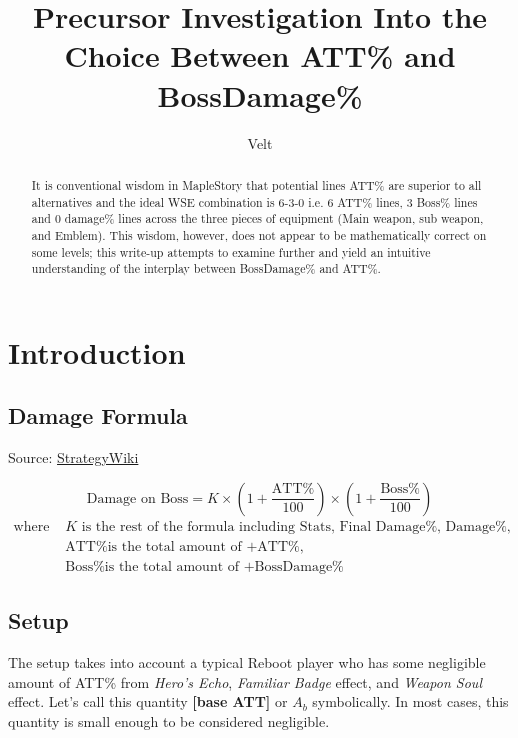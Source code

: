 \documentclass{article}
\title{Precursor Investigation Into the Choice Between ATT\% and BossDamage\%}
\author{Velt}
\begin{document}
\maketitle


\begin{abstract}
It is conventional wisdom in MapleStory that potential lines ATT\% are superior to all alternatives and the ideal WSE combination is 6-3-0 i.e. 6 ATT\% lines, 3 Boss\% lines and 0 damage\% lines across the three pieces of equipment (Main weapon, sub weapon, and Emblem).  
This wisdom, however, does not appear to be mathematically correct on some levels; this write-up attempts to examine further and yield an intuitive understanding of the interplay between BossDamage\% and ATT\%.
\end{abstract}

\vspace{1.5cm}

\section{Introduction}

\subsection{Damage Formula}

Source: \href{https://strategywiki.org/wiki/MapleStory/Formulas#Active_Skills}{StrategyWiki}

\begin{equation} \label{eq:1}
\text{Damage on Boss} = K \times \left( 1+\frac{\text{ATT\%}}{100} \right) \times \left( 1 + \frac{\text{Boss\%}}{100} \right)
\end{equation}
\begin{align*}
    \text{where } & K \text{ is the rest of the formula including Stats, Final Damage\%, Damage\%, etc.} \\
                  &  \text{ATT\% is the total amount of +ATT\%,} \\
                  &  \text{Boss\% is the total amount of +BossDamage\%}
\end{align*}

\subsection{Setup}

The setup takes into account a typical Reboot player who has some negligible amount of ATT\% from \emph{Hero's Echo}, \emph{Familiar Badge} effect, and \emph{Weapon Soul} effect. Let's call this quantity \textbf{[base ATT]} or $A_b$ symbolically. In most cases, this quantity is small enough to be considered negligible.
\end{document}

